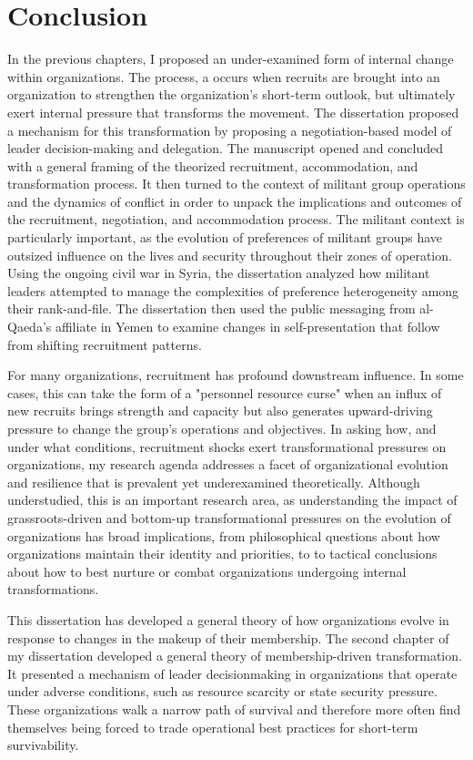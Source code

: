 \chapter{Conclusion}

In the previous chapters, I proposed an under-examined form of internal change within organizations. The process, a  occurs when recruits are brought into an organization to strengthen the organization's short-term outlook, but ultimately exert internal pressure that transforms the movement. The dissertation proposed a mechanism for this transformation by proposing a negotiation-based model of leader decision-making and delegation. The manuscript opened and concluded with a general framing of the theorized recruitment, accommodation, and transformation process. It then turned to the context of militant group operations and the dynamics of conflict in order to unpack the implications and outcomes of the recruitment, negotiation, and accommodation process. The militant context is particularly important, as the evolution of preferences of militant groups have outsized influence on the lives and security throughout their zones of operation. Using the ongoing civil war in Syria, the dissertation analyzed how militant leaders attempted to manage the complexities of preference heterogeneity among their rank-and-file. The dissertation then used the public messaging from al-Qaeda's affiliate in Yemen to examine changes in self-presentation that follow from shifting recruitment patterns.

For many organizations, recruitment has profound downstream influence.  In some cases, this can take the form of a "personnel resource curse" when an influx of new recruits brings strength and capacity but also generates upward-driving pressure to change the group's operations and objectives. In asking how, and under what conditions, recruitment shocks exert transformational pressures on organizations, my research agenda addresses a facet of organizational evolution and resilience that is prevalent yet underexamined theoretically. Although understudied, this is an important research area, as understanding the impact of grassroots-driven and bottom-up transformational pressures on the evolution of organizations has broad implications, from philosophical questions about how organizations maintain their identity and priorities, to  to tactical conclusions about how to best nurture or combat organizations undergoing internal transformations.

This dissertation has developed a general theory of how organizations evolve in response to changes in the makeup of their membership. 
The second chapter of my dissertation developed a general theory of membership-driven transformation. It presented a mechanism of leader decisionmaking in organizations that operate under adverse conditions, such as resource scarcity or state security pressure. These organizations walk a narrow path of survival and therefore more often find themselves being forced to trade operational best practices for short-term survivability.

